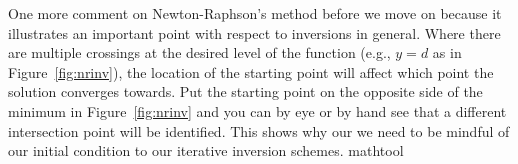 {    One more comment on Newton-Raphson's method before we move on because it illustrates an important point with respect to inversions in general.  Where there are multiple crossings at the desired level of the function (e.g., $y = d$ as in Figure~\ref{fig:nrinv}), the location of the starting point will affect which point the solution converges towards.  Put the starting point on the opposite side of the minimum in Figure~\ref{fig:nrinv} and you can by eye or by hand see that a different intersection point will be identified.  This shows why our we need to be mindful of our initial condition to our iterative inversion schemes.
}{mathtool}\label{box:newton_raphson}